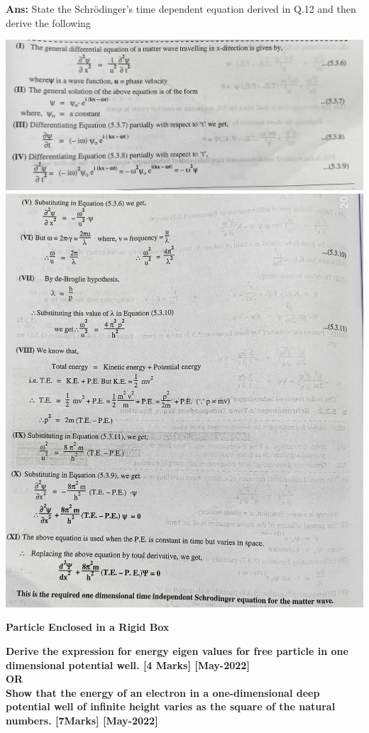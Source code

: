 \documentclass{exam}
\begin{document}
\begin{questions}
\textbf{Ans:} State the Schrödinger's time dependent equation derived in Q.12 and then derive the following 
\begin{center}
	\includegraphics[scale=0.1]{Q13-1.jpeg}
	\includegraphics[scale=0.315]{Q13-2.jpeg}
\end{center}


\newpage

\begin{center} \textbf{ \Large Particle Enclosed in a Rigid Box} \end{center}

\question \textbf{Derive the expression for energy eigen values for free particle in one dimensional potential well. \hfil [4 Marks] [May-2022] 
\\ OR \\
Show that the energy of an electron in a one-dimensional deep potential well of infinite height varies as the square of the natural numbers.  \hfil [7Marks] [May-2022] }


\end{questions}
\end{document}
